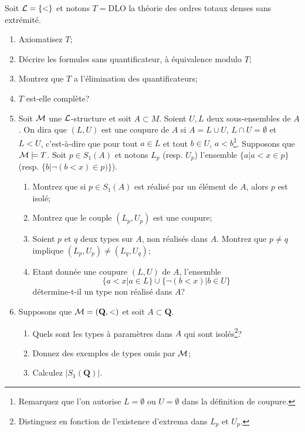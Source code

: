 \documentclass[12pt,a4paper]{exprog}
\newcommand{\IQ}{\mathbf{Q}}
\begin{document}
\begin{question}
  Soit $\mathcal{L}=\{<\}$ et notons $T=\text{DLO}$ la théorie des ordres totaux denses
  sans extrémité.
  \begin{enumerate}
  \item Axiomatisez $T$;
  \item Décrire les formules sans quantificateur, à équivalence modulo $T$;
  \item Montrez que $T$ a l'élimination des quantificateurs;
  \item $T$ est-elle complète?
  \item Soit $\mathcal{M}$ une $\mathcal{L}$-structure et soit $A\subset M$. Soient $U,L$
    deux sous-ensembles de $A$. On dira que $(L,U)$ est une coupure de $A$ si
    $A=L\cup U$, $L\cap
    U=\emptyset$ et $L<U$, c'est-à-dire que pour tout $a\in L$ et tout $b\in U$,
    $a<b$\footnote{Remarquez que l'on autorise $L=\emptyset$ ou $U=\emptyset$
      dans la définition de coupure.}.
    Supposons que $\mathcal{M}\models T$. Soit $p\in S_{1}(A)$ et notons
    $L_{p}$ (resp. $U_{p}$) l'ensemble
    $\{a|a<x\in p\}$ (resp. $\{b|\neg(b<x)\in p)\}$).
    \begin{enumerate}
    \item Montrez que si $p\in S_{1}(A)$ est réalisé par un élément de $A$,
      alors $p$ est isolé;
    \item Montrez que le couple
      $(L_{p},U_{p})$ est une coupure;
    \item Soient $p$ et $q$ deux types sur $A$, non réalisés dans $A$. Montrez
      que $p\neq q$ implique $(L_{p},U_{p})\neq (L_{q},U_{q})$;
    \item Etant donnée une coupure $(L,U)$ de $A$, l'ensemble
      \[\{a<x|a\in L\}\cup\{\neg(b<x)|b\in U\}\]
      détermine-t-il un type non réalisé dans $A$?
    \end{enumerate}
  \item Supposons que $\str{M}=(\IQ,<)$ et soit $A\subset \IQ$.
    \begin{enumerate}
    \item Quels sont les types à paramètres dans $A$ qui sont
      isolés\footnote{Distinguez en fonction de l'existence d'extrema dans
        $L_{p}$ et $U_{p}$.}?
    \item Donnez des exemples de types omis par $\mathcal{M}$;
    \item Calculez $|S_{1}(\IQ)|$.
    \end{enumerate}
  \end{enumerate}
\end{question}
\end{document}

